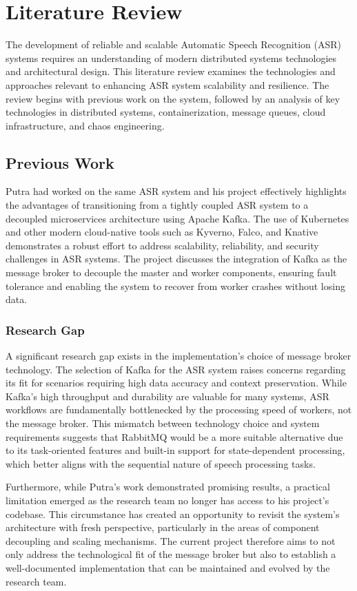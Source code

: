 \chapter{Literature Review} \label{chapter:literature_review}
The development of reliable and scalable Automatic Speech Recognition (ASR) systems requires an understanding of modern distributed systems technologies and architectural design. This literature review examines the technologies and approaches relevant to enhancing ASR system scalability and resilience. The review begins with previous work on the system, followed by an analysis of key technologies in distributed systems, containerization, message queues, cloud infrastructure, and chaos engineering.

\section{Previous Work}
Putra \cite{putra} had worked on the same ASR system and his project effectively highlights the advantages of transitioning from a tightly coupled ASR system to a decoupled microservices architecture using Apache Kafka. The use of Kubernetes and other modern cloud-native tools such as Kyverno, Falco, and Knative demonstrates a robust effort to address scalability, reliability, and security challenges in ASR systems. The project discusses the integration of Kafka as the message broker to decouple the master and worker components, ensuring fault tolerance and enabling the system to recover from worker crashes without losing data.

\subsection{Research Gap}
A significant research gap exists in the implementation's choice of message broker technology. The selection of Kafka for the ASR system raises concerns regarding its fit for scenarios requiring high data accuracy and context preservation. While Kafka's high throughput and durability are valuable for many systems, ASR workflows are fundamentally bottlenecked by the processing speed of workers, not the message broker. This mismatch between technology choice and system requirements suggests that RabbitMQ would be a more suitable alternative due to its task-oriented features and built-in support for state-dependent processing, which better aligns with the sequential nature of speech processing tasks.

Furthermore, while Putra’s work \cite{putra} demonstrated promising results, a practical limitation emerged as the research team no longer has access to his project's codebase. This circumstance has created an opportunity to revisit the system's architecture with fresh perspective, particularly in the areas of component decoupling and scaling mechanisms. The current project therefore aims to not only address the technological fit of the message broker but also to establish a well-documented implementation that can be maintained and evolved by the research team.



